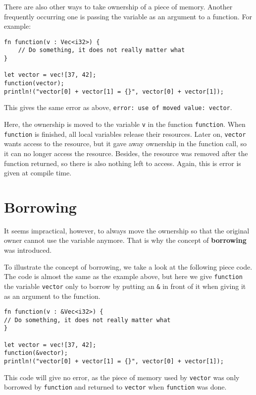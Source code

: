 There are also other ways to take ownership of a piece of memory. Another frequently occurring one is passing the variable as an argument to a function. For example:

\begin{verbatim}
fn function(v : Vec<i32>) {
    // Do something, it does not really matter what
}

let vector = vec![37, 42];
function(vector);
println!("vector[0] + vector[1] = {}", vector[0] + vector[1]);
\end{verbatim}
This gives the same error as above, \verb|error: use of moved value: vector|. 

Here, the ownership is moved to the variable \verb|v| in the function \verb|function|. When \verb|function| is finished, all local variables release their resources. Later on, \verb|vector| wants access to the resource, but it gave away ownership in the function call, so it can no longer access the resource. Besides, the resource was removed after the function returned, so there is also nothing left to access. Again, this is error is given at compile time. 

\section{Borrowing}
It seems impractical, however, to always move the ownership so that the original owner cannot use the variable anymore. That is why the concept of \textbf{borrowing} was introduced. %

To illustrate the concept of borrowing, we take a look at the following piece code. The code is almost the same as the example above, but here we give \verb|function| the variable \verb|vector| only to borrow by putting an \verb|&| in front of it when giving it as an argument to the function. 

\begin{verbatim}
fn function(v : &Vec<i32>) {
// Do something, it does not really matter what
}

let vector = vec![37, 42];
function(&vector);
println!("vector[0] + vector[1] = {}", vector[0] + vector[1]);
\end{verbatim}

This code will give no error, as the piece of memory used by \verb|vector| was only borrowed by \verb|function| and returned to \verb|vector| when \verb|function| was done. 


